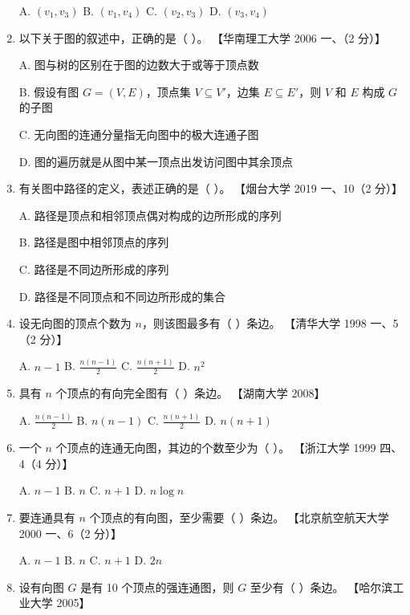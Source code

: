 \documentclass[lang=cn,newtx,10pt,scheme=chinese]{elegantbook}
\begin{document}
\begin{enumerate}
        A. $(v_1, v_3)$ \quad B. $(v_1, v_4)$ \quad C. $(v_2, v_3)$ \quad D. $(v_3, v_4)$  
    
        \item 以下关于图的叙述中，正确的是（ ）。  
        【华南理工大学 2006 一、（2 分）】  

        A. 图与树的区别在于图的边数大于或等于顶点数  

        B. 假设有图 $G = (V, E)$，顶点集 $V \subseteq V'$，边集 $E \subseteq E'$，则 $V$ 和 $E$ 构成 $G$ 的子图  

        C. 无向图的连通分量指无向图中的极大连通子图  

        D. 图的遍历就是从图中某一顶点出发访问图中其余顶点  
    
        \item 有关图中路径的定义，表述正确的是（ ）。  
        【烟台大学 2019 一、10（2 分）】  

        A. 路径是顶点和相邻顶点偶对构成的边所形成的序列  

        B. 路径是图中相邻顶点的序列  

        C. 路径是不同边所形成的序列  

        D. 路径是不同顶点和不同边所形成的集合  
    
        \item 设无向图的顶点个数为 $n$，则该图最多有（ ）条边。  
        【清华大学 1998 一、5（2 分）】  

        A. $n - 1$ \quad B. $\frac{n(n-1)}{2}$ \quad C. $\frac{n(n+1)}{2}$ \quad D. $n^2$ 


        \item 具有 $n$ 个顶点的有向完全图有（ ）条边。  
        【湖南大学 2008】  

        A. $\frac{n(n-1)}{2}$ \quad B. $n(n-1)$ \quad C. $\frac{n(n+1)}{2}$ \quad D. $n(n+1)$  
    
        \item 一个 $n$ 个顶点的连通无向图，其边的个数至少为（ ）。  
        【浙江大学 1999 四、4（4 分）】  

        A. $n-1$ \quad B. $n$ \quad C. $n+1$ \quad D. $n \log n$  
    
        \item 要连通具有 $n$ 个顶点的有向图，至少需要（ ）条边。  
        【北京航空航天大学 2000 一、6（2 分）】  

        A. $n-1$ \quad B. $n$ \quad C. $n+1$ \quad D. $2n$  
    
        \item 设有向图 $G$ 是有 10 个顶点的强连通图，则 $G$ 至少有（ ）条边。  
        【哈尔滨工业大学 2005】  


\end{enumerate}
\end{document}
